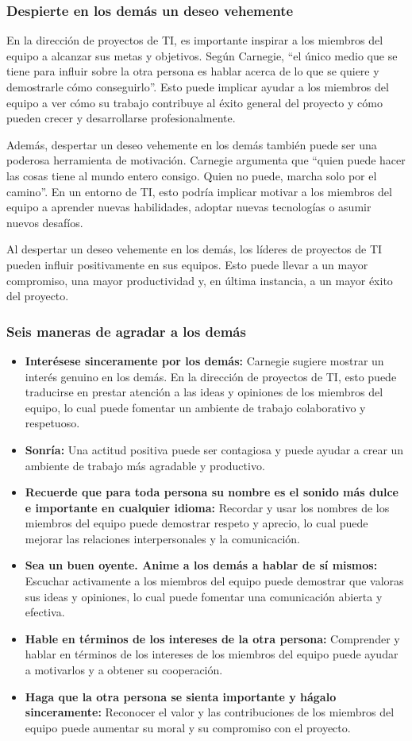 \documentclass[journal]{IEEEtran}
\begin{document}
\subsubsection{Despierte en los demás un deseo vehemente}
En la dirección de proyectos de TI, es importante inspirar a los miembros del equipo a alcanzar sus metas y objetivos. Según Carnegie, “el único medio que se tiene para influir sobre la otra persona es hablar acerca de lo que se quiere y demostrarle cómo conseguirlo”. Esto puede implicar ayudar a los miembros del equipo a ver cómo su trabajo contribuye al éxito general del proyecto y cómo pueden crecer y desarrollarse profesionalmente.

Además, despertar un deseo vehemente en los demás también puede ser una poderosa herramienta de motivación. Carnegie argumenta que “quien puede hacer las cosas tiene al mundo entero consigo. Quien no puede, marcha solo por el camino”. En un entorno de TI, esto podría implicar motivar a los miembros del equipo a aprender nuevas habilidades, adoptar nuevas tecnologías o asumir nuevos desafíos.

Al despertar un deseo vehemente en los demás, los líderes de proyectos de TI pueden influir positivamente en sus equipos. Esto puede llevar a un mayor compromiso, una mayor productividad y, en última instancia, a un mayor éxito del proyecto.

\subsubsection{Seis maneras de agradar a los demás}
\begin{itemize}
	\item \textbf{Interésese sinceramente por los demás:} Carnegie sugiere mostrar un interés genuino en los demás. En la dirección de proyectos de TI, esto puede traducirse en prestar atención a las ideas y opiniones de los miembros del equipo, lo cual puede fomentar un ambiente de trabajo colaborativo y respetuoso.
	\item \textbf{Sonría:} Una actitud positiva puede ser contagiosa y puede ayudar a crear un ambiente de trabajo más agradable y productivo.
	\item \textbf{Recuerde que para toda persona su nombre es el sonido más dulce e importante en cualquier idioma:} Recordar y usar los nombres de los miembros del equipo puede demostrar respeto y aprecio, lo cual puede mejorar las relaciones interpersonales y la comunicación.
	\item \textbf{Sea un buen oyente. Anime a los demás a hablar de sí mismos:} Escuchar activamente a los miembros del equipo puede demostrar que valoras sus ideas y opiniones, lo cual puede fomentar una comunicación abierta y efectiva.
	\item \textbf{Hable en términos de los intereses de la otra persona:} Comprender y hablar en términos de los intereses de los miembros del equipo puede ayudar a motivarlos y a obtener su cooperación.
	\item \textbf{Haga que la otra persona se sienta importante y hágalo sinceramente:} Reconocer el valor y las contribuciones de los miembros del equipo puede aumentar su moral y su compromiso con el proyecto.
\end{itemize}
\end{document}
